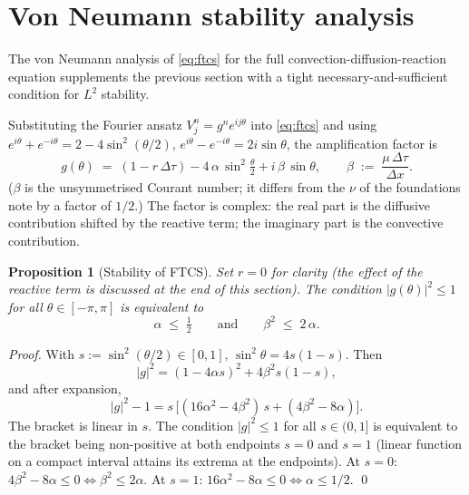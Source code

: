 \documentclass[11pt,a4paper]{article}
\newtheorem{proposition}{Proposition}[section]
\begin{document}
\section{Von Neumann stability analysis}\label{sec:vN}

The von Neumann analysis of \eqref{eq:ftcs} for the full
convection-diffusion-reaction equation supplements the previous
section with a tight necessary-and-sufficient condition for $L^2$
stability.

Substituting the Fourier ansatz $V_j^n = g^n e^{ij\theta}$ into
\eqref{eq:ftcs} and using $e^{i\theta} + e^{-i\theta} = 2 - 4\sin^2(\theta/2)$,
$e^{i\theta} - e^{-i\theta} = 2 i\sin\theta$, the amplification factor is
\begin{equation}
g(\theta) \;=\; (1 - r\,\Delta\tau)
- 4\,\alpha\,\sin^2\!\tfrac{\theta}{2}
+ i\,\beta\,\sin\theta,
\qquad
\beta \;:=\; \frac{\mu\,\Delta\tau}{\Delta x}.
\label{eq:vn-factor}
\end{equation}
($\beta$ is the unsymmetrised Courant number; it differs from the
$\nu$ of the foundations note by a factor of $1/2$.) The factor is complex: the
real part is the diffusive contribution shifted by the reactive term;
the imaginary part is the convective contribution.

\begin{proposition}[Stability of FTCS]
Set $r = 0$ for clarity (the effect of the reactive term is
discussed at the end of this section). The condition $|g(\theta)|^2 \le 1$ for all
$\theta \in [-\pi, \pi]$ is equivalent to
\begin{equation}
\alpha \;\le\; \tfrac{1}{2}
\qquad\text{and}\qquad
\beta^2 \;\le\; 2\,\alpha.
\label{eq:vn-conds}
\end{equation}
\end{proposition}

\begin{proof}
With $s := \sin^2(\theta/2) \in [0, 1]$, $\sin^2\theta = 4 s (1-s)$.
Then
\[
|g|^2 = (1 - 4\alpha s)^2 + 4\beta^2 s(1-s),
\]
and after expansion,
\[
|g|^2 - 1 = s\,\bigl[(16\alpha^2 - 4\beta^2)\,s + (4\beta^2 - 8\alpha)\bigr].
\]
The bracket is linear in $s$. The condition $|g|^2 \le 1$ for all
$s \in (0, 1]$ is equivalent to the bracket being non-positive at
both endpoints $s = 0$ and $s = 1$ (linear function on a compact
interval attains its extrema at the endpoints). At $s = 0$:
$4\beta^2 - 8\alpha \le 0 \Leftrightarrow \beta^2 \le 2\alpha$. At
$s = 1$: $16\alpha^2 - 8\alpha \le 0 \Leftrightarrow \alpha \le 1/2$.
\qed
\end{proof}
\end{document}
